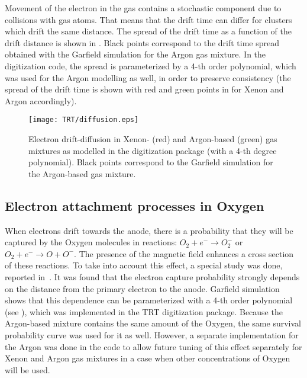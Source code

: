
Movement of the electron in the gas contains a stochastic component due to collisions with gas atoms. 
That means that the drift time can differ for clusters which drift the same distance.
The spread of the drift time as a function of the drift distance is shown in .
Black points correspond to the drift time spread obtained with the Garfield simulation for the Argon gas mixture.
In the digitization code, the spread is parameterized by a 4-th order polynomial, which was used for the Argon modelling as well,
in order to preserve consistency (the spread of the drift time is shown with red and green points in  for Xenon and Argon accordingly).

\begin{figure}
\begin{center}
\texttt{[image: TRT/diffusion.eps]}
\caption{Electron drift-diffusion in Xenon- (red) and Argon-based (green) gas mixtures as modelled in the digitization package (with a 4-th degree polynomial). 
Black points correspond to the Garfield simulation for the Argon-based gas mixture.}
\label{fig:diffusion}
\end{center}
\end{figure}


\subsection{Electron attachment processes in Oxygen}
\label{subsec:recapture}
When electrons drift towards the anode, there is a probability that they will be captured by the Oxygen molecules in reactions:
$O_2 + e^- \to O_2^-$ or $O_2 + e^- \to O + O^-$. The presence of the magnetic field enhances a cross section of these reactions.
To take into account this effect, a special study was done, reported in~\cite{esben_thesis}.
It was found that the electron capture probability strongly depends on the distance from the primary electron to the anode.
Garfield simulation shows that this dependence can be parameterized with a 4-th order polynomial (see ), 
which was implemented in the TRT digitization package. 
Because the Argon-based mixture contains the same amount of the Oxygen, the same survival probability
curve was used for it as well. However, a separate implementation for the Argon was done in the code to allow future tuning of this effect separately for Xenon and Argon gas mixtures
in a case when other concentrations of Oxygen will be used.

